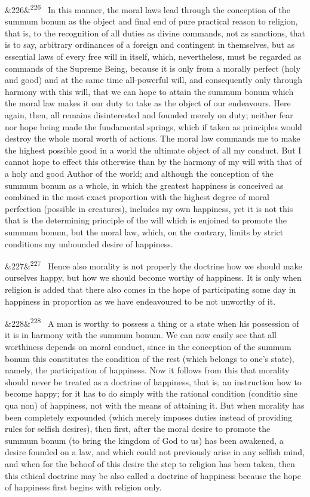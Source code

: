 \documentclass[12pt]{article}
\newcommand{\para}[1][]{\par\noindent\ifx&#1&\else\textsuperscript{\footnotesize #1}~\fi}
\begin{document}
\para[226] In this manner, the moral laws lead through the conception of the summum bonum as the object and final end of pure practical reason to religion, that is, to the recognition of all duties as divine commands, not as sanctions, that is to say, arbitrary ordinances of a foreign and contingent in themselves, but as essential laws of every free will in itself, which, nevertheless, must be regarded as commands of the Supreme Being, because it is only from a morally perfect (holy and good) and at the same time all-powerful will, and consequently only through harmony with this will, that we can hope to attain the summum bonum which the moral law makes it our duty to take as the object of our endeavours. Here again, then, all remains disinterested and founded merely on duty; neither fear nor hope being made the fundamental springs, which if taken as principles would destroy the whole moral worth of actions. The moral law commands me to make the highest possible good in a world the ultimate object of all my conduct. But I cannot hope to effect this otherwise than by the harmony of my will with that of a holy and good Author of the world; and although the conception of the summum bonum as a whole, in which the greatest happiness is conceived as combined in the most exact proportion with the highest degree of moral perfection (possible in creatures), includes my own happiness, yet it is not this that is the determining principle of the will which is enjoined to promote the summum bonum, but the moral law, which, on the contrary, limits by strict conditions my unbounded desire of happiness.

\para[227] Hence also morality is not properly the doctrine how we should make ourselves happy, but how we should become worthy of happiness. It is only when religion is added that there also comes in the hope of participating some day in happiness in proportion as we have endeavoured to be not unworthy of it.

\para[228] A man is worthy to possess a thing or a state when his possession of it is in harmony with the summum bonum. We can now easily see that all worthiness depends on moral conduct, since in the conception of the summum bonum this constitutes the condition of the rest (which belongs to one's state), namely, the participation of happiness. Now it follows from this that morality should never be treated as a doctrine of happiness, that is, an instruction how to become happy; for it has to do simply with the rational condition (conditio sine qua non) of happiness, not with the means of attaining it. But when morality has been completely expounded (which merely imposes duties instead of providing rules for selfish desires), then first, after the moral desire to promote the summum bonum (to bring the kingdom of God to us) has been awakened, a desire founded on a law, and which could not previously arise in any selfish mind, and when for the behoof of this desire the step to religion has been taken, then this ethical doctrine may be also called a doctrine of happiness because the hope of happiness first begins with religion only.
\end{document}
